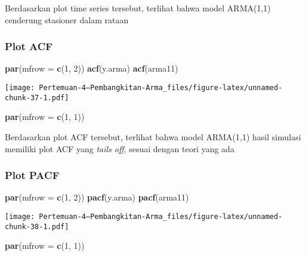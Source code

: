 \documentclass[
]{article}
\newenvironment{Shaded}{\begin{snugshade}}{\end{snugshade}}
\newcommand{\AttributeTok}[1]{\textcolor[rgb]{0.13,0.29,0.53}{#1}}
\newcommand{\DecValTok}[1]{\textcolor[rgb]{0.00,0.00,0.81}{#1}}
\newcommand{\FunctionTok}[1]{\textcolor[rgb]{0.13,0.29,0.53}{\textbf{#1}}}
\newcommand{\NormalTok}[1]{#1}
\begin{document}
Berdasarkan plot time series tersebut, terlihat bahwa model ARMA(1,1)
cenderung stasioner dalam rataan

\subsubsection{Plot ACF}\label{plot-acf-2}

\begin{Shaded}
\begin{Highlighting}[]
\FunctionTok{par}\NormalTok{(}\AttributeTok{mfrow =} \FunctionTok{c}\NormalTok{(}\DecValTok{1}\NormalTok{, }\DecValTok{2}\NormalTok{))}
\FunctionTok{acf}\NormalTok{(y.arma)}
\FunctionTok{acf}\NormalTok{(arma11)}
\end{Highlighting}
\end{Shaded}

\texttt{[image: Pertemuan-4---Pembangkitan-Arma\_files/figure-latex/unnamed-chunk-37-1.pdf]}

\begin{Shaded}
\begin{Highlighting}[]
\FunctionTok{par}\NormalTok{(}\AttributeTok{mfrow =} \FunctionTok{c}\NormalTok{(}\DecValTok{1}\NormalTok{, }\DecValTok{1}\NormalTok{))}
\end{Highlighting}
\end{Shaded}

Berdasarkan plot ACF tersebut, terlihat bahwa model ARMA(1,1) hasil
simulasi memiliki plot ACF yang \emph{tails off}, sesuai dengan teori
yang ada

\subsubsection{Plot PACF}\label{plot-pacf-2}

\begin{Shaded}
\begin{Highlighting}[]
\FunctionTok{par}\NormalTok{(}\AttributeTok{mfrow =} \FunctionTok{c}\NormalTok{(}\DecValTok{1}\NormalTok{, }\DecValTok{2}\NormalTok{))}
\FunctionTok{pacf}\NormalTok{(y.arma)}
\FunctionTok{pacf}\NormalTok{(arma11)}
\end{Highlighting}
\end{Shaded}

\texttt{[image: Pertemuan-4---Pembangkitan-Arma\_files/figure-latex/unnamed-chunk-38-1.pdf]}

\begin{Shaded}
\begin{Highlighting}[]
\FunctionTok{par}\NormalTok{(}\AttributeTok{mfrow =} \FunctionTok{c}\NormalTok{(}\DecValTok{1}\NormalTok{, }\DecValTok{1}\NormalTok{))}
\end{Highlighting}
\end{Shaded}
\end{document}
